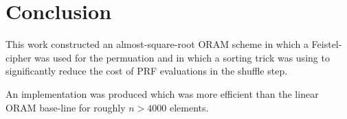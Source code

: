 \section{Conclusion}

This work constructed an almost-square-root ORAM scheme 
in which a Feistel-cipher was used for the permuation
and in which a sorting trick was using to significantly
reduce the cost of PRF evaluations in the shuffle step.

An implementation was produced which was more efficient than the 
linear ORAM base-line for roughly $n > 4000$ elements.

